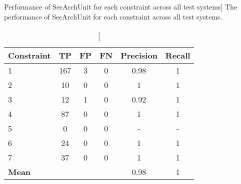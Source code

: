 \begin{table}[h]
\captionsetup{justification=centering}
\caption
    [Performance of SecArchUnit for each constraint across all test systems]
    {The performance of SecArchUnit for each constraint across all test systems.}
\begin{center}
\begin{tabular}{lccccc}
                    \textbf{Constraint}  & \textbf{TP} & \textbf{FP} & \textbf{FN} & \textbf{Precision} & \textbf{Recall} \\
\hline
1 & 167         & 3           & 0           & 0.98      & 1          \\
\rowcolor{RowColor}
2 & 10          & 0           & 0           & 1      & 1          \\
3 & 12          & 1           & 0           & 0.92      & 1          \\
\rowcolor{RowColor}
4 & 87          & 0           & 0           & 1      & 1          \\
5 & 0           & 0           & 0           & -      & -         \\
\rowcolor{RowColor}
6 & 24 & 0 & 0 & 1 & 1 \\
7 & 37 & 0 & 0 & 1 & 1 \\
\hline
\textbf{Mean}         &             &             &             & 0.98      & 1         
\end{tabular}
\end{center}

\label{tab:secarchUnit_constraint}
\end{table}